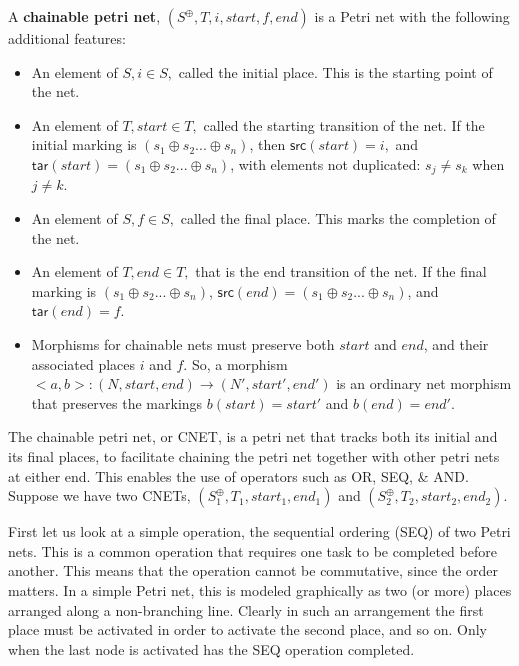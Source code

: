 \begin{definition}
  \label{Chainable-Petri-Net}
  A \textbf{chainable petri net}, $(S^\oplus, T, i, start, f, end)$ is a Petri net with the following additional features: 
  \begin{itemize}
  \item An element of $S, i \in S,$ called the initial place. This is the starting point of the net.
  \item An element of $T, start \in T,$ called the starting transition of the net. If the initial marking is $(s_1 \oplus s_2 ... \oplus s_n)$, then $\mathsf{src}(start) = i,$ and $\mathsf{tar}(start) = (s_1 \oplus s_2 ... \oplus s_n)$, with elements not duplicated: $s_j \neq s_k$ when $j \neq k$. %
  \item An element of $S, f \in S,$ called the final place. This marks the completion of the net.
  \item An element of $T, end \in T,$ that is the end transition of the net. If the final marking is $(s_1 \oplus s_2 ... \oplus s_n)$, $\mathsf{src}(end) = (s_1 \oplus s_2 ... \oplus s_n)$, and $\mathsf{tar}(end) = f$. 
   \item Morphisms for chainable nets must preserve both $start$ and $end$, and their associated places $i$ and $f$. So, a morphism $<a,b>: (N, start, end) \to (N', start', end')$ is an ordinary net morphism that preserves the markings $b(start) = start'$ and $b(end) = end'$. 
 \end{itemize}
\end{definition}
The chainable petri net, or CNET, is a petri net that tracks both its initial and its final places, to facilitate chaining the petri net together with other petri nets at either end. This enables the use of operators such as OR, SEQ, \& AND.\\
Suppose we have two CNETs, $(S_1^\oplus, T_1, start_1, end_1)$ and $(S_2^\oplus, T_2, start_2, end_2)$. \\
\begin{example}
  \label{ex:SEQ-PN}
First let us look at a simple operation, the sequential ordering (SEQ) of two Petri nets. This is a common operation that requires one task to be completed before another. This means that the operation cannot be commutative, since the order matters. In a simple Petri net, this is modeled graphically as two (or more) places arranged along a non-branching line. Clearly in such an arrangement the first place must be activated in order to activate the second place, and so on. Only when the last node is activated has the SEQ operation completed.    
\end{example}
